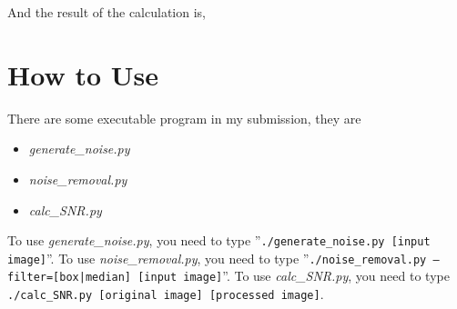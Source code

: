 \documentclass[14pt,a4paper]{extarticle}
\begin{document}
And the result of the calculation is,


\section{How to Use}

There are some executable program in my submission, they are
\begin{itemize}
	\item \textit{generate\_noise.py}
	\item \textit{noise\_removal.py}
	\item \textit{calc\_SNR.py}
\end{itemize}
To use \textit{generate\_noise.py}, you need to type ''\texttt{./generate\_noise.py [input image]}''. To use \textit{noise\_removal.py}, you need to type ''\texttt{./noise\_removal.py --filter=[box|median] [input image]}''. To use \textit{calc\_SNR.py}, you need to type \texttt{./calc\_SNR.py [original image] [processed image]}.
\end{document}
